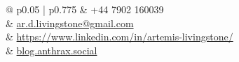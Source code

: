 \documentclass[
	9pt, %
]{FreemanCV}
\begin{document}
\begin{paracol}{2}
	
	
	
	
	



\switchcolumn %


\parbox[top][0.08\textheight][c]{\linewidth}{ %
	\colorbox{shade}{ %
		\begin{supertabular}{@{\hspace{3pt}} p{0.05\linewidth} | p{0.775\linewidth}} %
			\raisebox{-1pt}{\faPhone} & +44 7902 160039 \\ %
			\raisebox{-1pt}{\small\faEnvelope} & \href{mailto:ar.d.livingstone@gmail.com}{ar.d.livingstone@gmail.com} \\ %
			\raisebox{-1pt}{\faLinkedinSquare} & \href{https://www.linkedin.com/in/artemis-livingstone/}{https://www.linkedin.com/in/artemis-livingstone/} \\ %
			\raisebox{-1pt}{\small\faDesktop} & \href{blog.anthrax.social}{blog.anthrax.social} \\ %
		\end{supertabular}
	}
	\vfill %
}


\end{paracol}
\end{document}
